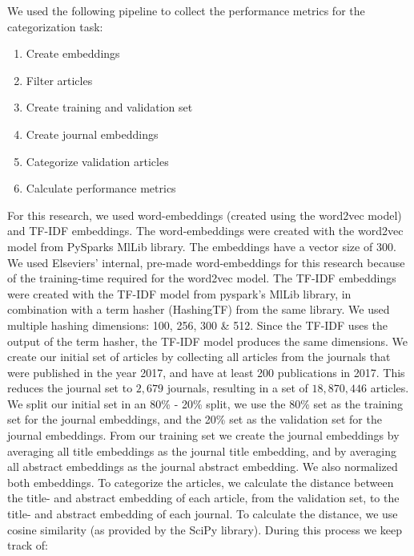 \documentclass[../../Thesis.tex]{subfiles}
\begin{document}
We used the following pipeline to collect the performance metrics for the categorization task:
\begin{enumerate}
\item{Create embeddings}
\item{Filter articles}
\item{Create training and validation set}
\item{Create journal embeddings}
\item{Categorize validation articles}
\item{Calculate performance metrics}
\end{enumerate}

For this research, we used word-embeddings (created using the word2vec model) and TF-IDF embeddings. The word-embeddings were created with the word2vec model from PySparks MlLib library\cite{PysparkMlLib}. The embeddings have a vector size of 300. We used Elseviers' internal, pre-made word-embeddings for this research because of the training-time required for the word2vec model.
The TF-IDF embeddings were created with the TF-IDF model from pyspark's MlLib library\cite{PysparkMlLib}, in combination with a term hasher (HashingTF) from the same library. We used multiple hashing dimensions: 100, 256, 300 \& 512. Since the TF-IDF uses the output of the term hasher, the TF-IDF model produces the same dimensions.
We create our initial set of articles by collecting all articles from the journals that were published in the year 2017, and have at least 200 publications in 2017. This reduces the journal set to $2,679$ journals, resulting in a set of $18,870,446$ articles.
We split our initial set in an 80\% - 20\% split, we use the 80\% set as the training set for the journal embeddings, and the 20\% set as the validation set for the journal embeddings.
From our training set we create the journal embeddings by averaging all title embeddings as the journal title embedding, and by averaging all abstract embeddings as the journal abstract embedding. We also normalized both embeddings. 
To categorize the articles, we calculate the distance between the title- and abstract embedding of each article, from the validation set, to the title- and abstract embedding of each journal. To calculate the distance, we use cosine similarity (as provided by the SciPy library\cite{SciPy}). During this process we keep track of:
\end{document}
